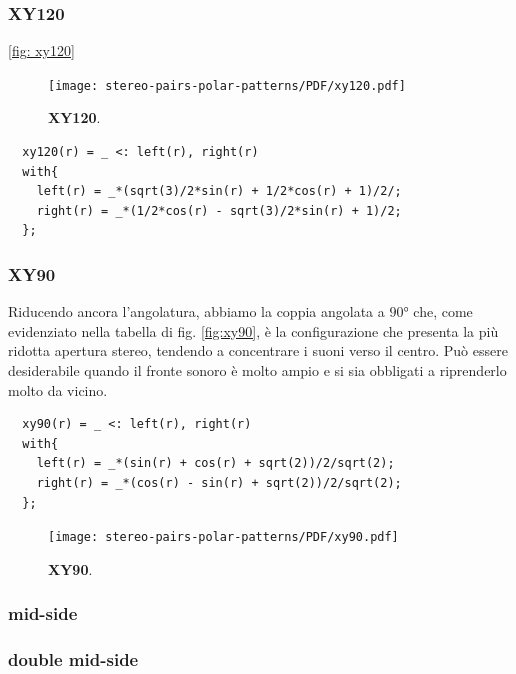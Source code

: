\subsubsection*{XY120}
\ref{fig: xy120}
\begin{figure}[h]
\begin{center}
\texttt{[image: stereo-pairs-polar-patterns/PDF/xy120.pdf]}
\caption{\textbf{XY120}.}
\label{xy120}
\end{center}
\end{figure}
\begin{lstlisting}
  xy120(r) = _ <: left(r), right(r)
  with{
    left(r) = _*(sqrt(3)/2*sin(r) + 1/2*cos(r) + 1)/2/;
    right(r) = _*(1/2*cos(r) - sqrt(3)/2*sin(r) + 1)/2;
  };
\end{lstlisting}
\subsubsection*{XY90}
Riducendo ancora l’angolatura, abbiamo la coppia angolata a $90°$ che, come
evidenziato nella tabella di fig. \ref{fig:xy90}, è la configurazione
che presenta la più ridotta apertura stereo, tendendo a concentrare i suoni
verso il centro. Può essere desiderabile quando il fronte sonoro è molto ampio
e si sia obbligati a riprenderlo molto da vicino.
\begin{lstlisting}
  xy90(r) = _ <: left(r), right(r)
  with{
    left(r) = _*(sin(r) + cos(r) + sqrt(2))/2/sqrt(2);
    right(r) = _*(cos(r) - sin(r) + sqrt(2))/2/sqrt(2);
  };
\end{lstlisting}
\begin{figure}[h]
\begin{center}
\texttt{[image: stereo-pairs-polar-patterns/PDF/xy90.pdf]}
\caption{\textbf{XY90}.}
\label{xy90}
\end{center}
\end{figure}
\subsubsection*{mid-side}
\subsubsection*{double mid-side}

